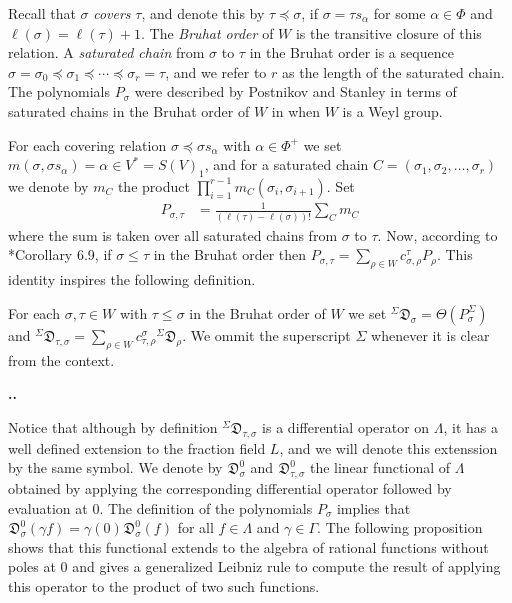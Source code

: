 \documentclass[11pt,fleqn]{amsart}
\renewcommand\thesection{\arabic{section}}
\newcounter{para}[section]
\renewcommand\thepara{\thesection.\arabic{para}}
\def\paragraph{%
 \noindent
 \refstepcounter{para}%
 \textbf{\thepara.}\hspace{1ex}%
}
\newcommand\D[3]{{}^{#1} \mathfrak D_{#2}^{#3}}
\begin{document}
Recall that $\sigma$ \emph{covers} $\tau$, and denote this by $\tau
\preceq \sigma$, if $\sigma = \tau s_\alpha$ for some $\alpha \in \Phi$ and 
$\ell(\sigma) = \ell(\tau) + 1$. The \emph{Bruhat order} of $W$ is the 
transitive closure of this relation. A \emph{saturated chain} from $\sigma$ to 
$\tau$ in the Bruhat order is a sequence $\sigma = \sigma_0 \preceq \sigma_1 
\preceq \cdots \preceq \sigma_r = \tau$, and we refer to $r$ as the length of 
the saturated chain. The polynomials $P_\sigma$ were described by Postnikov 
and Stanley in terms of saturated chains in the Bruhat order of $W$ in 
\cite{PS-chains-bruhat} when $W$ is a Weyl group. 

For each covering relation $\sigma \preceq \sigma s_\alpha$ with 
$\alpha \in \Phi^+$ we set $m(\sigma,\sigma s_\alpha) = \alpha \in V^* = 
S(V)_1$, and for a saturated chain $C = (\sigma_1, \sigma_2, \ldots, 
\sigma_r)$ we denote by $m_C$ the product $\prod_{i=1}^{r-1} 
m_C(\sigma_i,\sigma_{i+1})$. Set
\begin{align*}
P_{\sigma, \tau} &= \frac{1}{(\ell(\tau) - \ell(\sigma))!}\sum_C m_C
\end{align*}
where the sum is taken over all saturated chains from $\sigma$ to $\tau$. 
Now, according to \cite{PS-chains-bruhat}*{Corollary 6.9}, if $\sigma \leq 
\tau$ in the Bruhat order then $P_{\sigma,\tau} = \sum_{\rho \in W} 
c^{\tau}_{\sigma,\rho} P_{\rho}$. This identity inspires the following 
definition.
\begin{Definition}
For each $\sigma, \tau \in W$ with $\tau \leq \sigma$ in the Bruhat order of 
$W$ we set $\D{\Sigma}{\sigma}{} = \Theta(P_\sigma^\Sigma)$ and 
$\D{\Sigma}{\tau,\sigma}{} = \sum_{\rho \in W} c^\sigma_{\tau, \rho} 
\D{\Sigma}{\rho}{}$. We ommit the superscript $\Sigma$ whenever it is clear 
from the context.
\end{Definition}

\paragraph
Notice that although by definition $\D{\Sigma}{\tau, \sigma}{}$ is a 
differential operator on $\Lambda$, it has a well defined extension to the 
fraction field $L$, and we will denote this extenssion by the same symbol. We 
denote by $\D{}{\sigma}{0}$ and $\D{}{\tau, \sigma}{0}$ the linear functional 
of $\Lambda$ obtained by applying the corresponding differential operator 
followed by evaluation at $0$. The definition of the polynomials $P_\sigma$ 
implies that $\D{}{\sigma}{0}(\gamma f) = \gamma(0) \D{}{\sigma}{0}(f)$ for 
all $f \in \Lambda$ and $\gamma \in \Gamma$. The following proposition shows 
that this functional extends to the algebra of rational functions without 
poles at $0$ and gives a generalized Leibniz rule to compute the result of 
applying this operator to the product of two such functions. 
\end{document}
